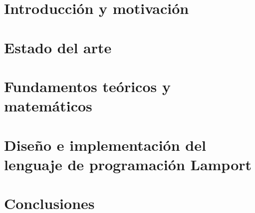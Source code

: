 \documentclass[11pt, a4paper]{book}
\begin{document}
	

	

	\newpage
	\tableofcontents

	\newpage
	\listoffigures

	\listoftables 
	\newpage

        \part{Introducción y motivación}
        
        
        

        \part{Estado del arte}
        

        \part{Fundamentos teóricos y matemáticos}
        
        
        

        \part{Diseño e implementación del lenguaje de programación Lamport}
        
	
	
	

        \part{Conclusiones}
	


	
	\newpage
        \nocite{*}
	
	
	
\end{document}
